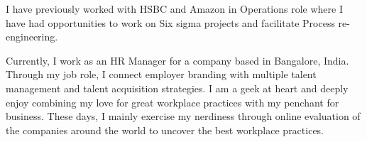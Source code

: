 \documentclass[12pt, titlepage]{article}
\begin{document}
I have previously worked with HSBC and Amazon in Operations role where I
have had opportunities to work on Six sigma projects and facilitate
Process re-engineering.

Currently, I work as an HR Manager for a company based in Bangalore,
India. Through my job role, I connect employer branding with multiple
talent management and talent acquisition strategies. I am a geek at
heart and deeply enjoy combining my love for great workplace practices
with my penchant for business. These days, I mainly exercise my
nerdiness through online evaluation of the companies around the world to
uncover the best workplace practices.


\end{document}
